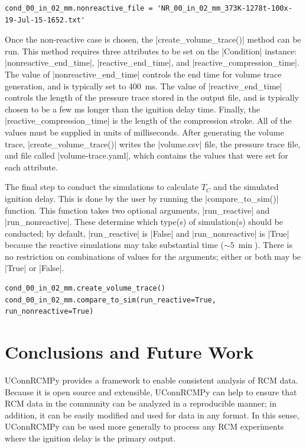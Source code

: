 \documentclass[12pt]{../ussci}
\begin{document}
\begin{verbatim}
cond_00_in_02_mm.nonreactive_file = 'NR_00_in_02_mm_373K-1278t-100x-19-Jul-15-1652.txt'
\end{verbatim}

Once the non-reactive case is chosen, the \python|create_volume_trace()| method
can be run. This method requires three attributes to be set on the
\python|Condition| instance: \python|nonreactive_end_time|,
\python|reactive_end_time|, and \python|reactive_compression_time|. The value of
\python|nonreactive_end_time| controls the end time for volume trace generation,
and is typically set to \SI{400}{\ms}. The value of \python|reactive_end_time|
controls the length of the pressure trace stored in the output file, and is
typically chosen to be a few \si{\ms} longer than the ignition delay time.
Finally, the \python|reactive_compression_time| is the length of the compression
stroke. All of the values must be supplied in units of milliseconds. After
generating the volume trace, \python|create_volume_trace()| writes the
\python|volume.csv| file, the pressure trace file, and file called
\python|volume-trace.yaml|, which contains the values that were set for each
attribute.

The final step to conduct the simulations to calculate \(T_C\) and the simulated
ignition delay. This is done by the user by running the
\python|compare_to_sim()| function. This function takes two optional arguments,
\python|run_reactive| and \python|run_nonreactive|. These determine which
type(s) of simulation(s) should be conducted; by default,
\python|run_reactive| is \python|False| and \python|run_nonreactive| is
\python|True| because the reactive simulations may take substantial time
($\sim\SI{5}{\min}$). There is no restriction on combinations of values for the
arguments; either or both may be \python|True| or \python|False|.

\begin{verbatim}
cond_00_in_02_mm.create_volume_trace()
cond_00_in_02_mm.compare_to_sim(run_reactive=True, run_nonreactive=True)
\end{verbatim}

\section{Conclusions and Future Work}\label{conclusions-and-future-work}

UConnRCMPy provides a framework to enable consistent analysis of RCM
data. Because it is open source and extensible, UConnRCMPy can help to
ensure that RCM data in the community can be analyzed in a reproducible
manner; in addition, it can be easily modified and used for data in any
format. In this sense, UConnRCMPy can be used more generally to process
any RCM experiments where the ignition delay is the primary output.
\end{document}
